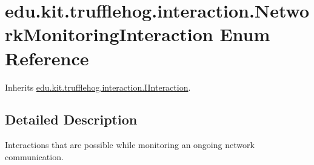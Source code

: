 \hypertarget{enumedu_1_1kit_1_1trufflehog_1_1interaction_1_1_network_monitoring_interaction}{}\section{edu.\+kit.\+trufflehog.\+interaction.\+Network\+Monitoring\+Interaction Enum Reference}
\label{enumedu_1_1kit_1_1trufflehog_1_1interaction_1_1_network_monitoring_interaction}


Inherits \hyperlink{interfaceedu_1_1kit_1_1trufflehog_1_1interaction_1_1_i_interaction}{edu.\+kit.\+trufflehog.\+interaction.\+I\+Interaction}.



\subsection{Detailed Description}
Interactions that are possible while monitoring an ongoing network communication. 